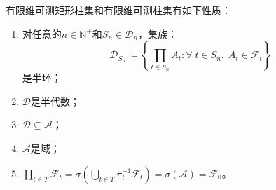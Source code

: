 \begin{property}\label{prop:FiniteDimensionalCylinderSet}
	有限维可测矩形柱集和有限维可测柱集有如下性质：
	\begin{enumerate}
		\item 对任意的$n\in\mathbb{N}^+$和$S_n\in\mathcal{D}_n$，集族：
		\begin{equation*}
			\mathscr{D}_{S_n}\coloneq\left\{\prod_{t\in S_n}A_t:\forall\;t\in S_n,\;A_t\in\mathscr{F}_t\right\}
		\end{equation*}
		是半环；
		\item $\mathscr{D}$是半代数；
		\item $\mathscr{D}\subseteq\mathscr{A}$；
		\item $\mathscr{A}$是域；
		\item $\prod\limits_{t\in T}\mathscr{F}_t=\sigma\left(\underset{t\in T}{\bigcup}\pi_t^{-1}\mathscr{F}_t\right)=\sigma(\mathscr{A})=\mathscr{F}_0$。
	\end{enumerate}
\end{property}
